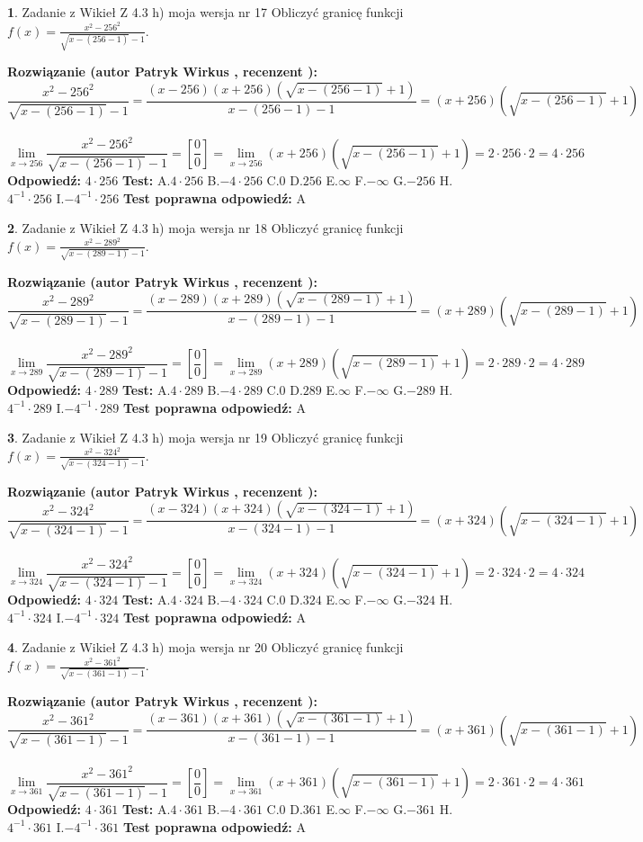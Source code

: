 \documentclass[12pt, a4paper]{article}
\theoremstyle{definition} %
\newtheorem{zad}{}
\newcommand{\zadStart}[1]{\begin{zad}#1\newline}
\newcommand{\zadStop}{\end{zad}}
\newcommand{\rozwStart}[2]{\noindent \textbf{Rozwiązanie (autor #1 , recenzent #2): }\newline}
\newcommand{\rozwStop}{\newline}
\newcommand{\odpStart}{\noindent \textbf{Odpowiedź:}\newline}
\newcommand{\odpStop}{\newline}
\newcommand{\testStart}{\noindent \textbf{Test:}\newline}
\newcommand{\testStop}{\newline}
\newcommand{\kluczStart}{\noindent \textbf{Test poprawna odpowiedź:}\newline}
\newcommand{\kluczStop}{\newline}
\begin{document}
\zadStart{Zadanie z Wikieł Z 4.3 h) moja wersja nr 17}
Obliczyć granicę funkcji $f(x)=\frac{x^{2} - 256^{2}}{\sqrt{x-(256-1)}-1}$.
\zadStop
\rozwStart{Patryk Wirkus}{}
$$\frac{x^{2} - 256^{2}}{\sqrt{x-(256-1)}-1}=\frac{(x-256)(x+256)(\sqrt{x-(256-1)}+1)}{x-(256-1)-1}=(x+256)(\sqrt{x-(256-1)}+1)$$
\\
$$\lim\limits_{x\to 256}\frac{x^{2} - 256^{2}}{\sqrt{x-(256-1)}-1}=[\frac{0}{0}]=
\lim\limits_{x\to 256}(x+256)(\sqrt{x-(256-1)}+1) = 2\cdot256 \cdot 2 = 4 \cdot 256$$
\rozwStop
\odpStart
$4\cdot256$
\odpStop
\testStart
A.$4\cdot256$
B.$-4\cdot256$
C.$0$
D.$256$
E.$\infty$
F.$-\infty$
G.$-256$
H.$4^{-1}\cdot256$
I.$-4^{-1}\cdot256$
\testStop
\kluczStart
A
\kluczStop



\zadStart{Zadanie z Wikieł Z 4.3 h) moja wersja nr 18}
Obliczyć granicę funkcji $f(x)=\frac{x^{2} - 289^{2}}{\sqrt{x-(289-1)}-1}$.
\zadStop
\rozwStart{Patryk Wirkus}{}
$$\frac{x^{2} - 289^{2}}{\sqrt{x-(289-1)}-1}=\frac{(x-289)(x+289)(\sqrt{x-(289-1)}+1)}{x-(289-1)-1}=(x+289)(\sqrt{x-(289-1)}+1)$$
\\
$$\lim\limits_{x\to 289}\frac{x^{2} - 289^{2}}{\sqrt{x-(289-1)}-1}=[\frac{0}{0}]=
\lim\limits_{x\to 289}(x+289)(\sqrt{x-(289-1)}+1) = 2\cdot289 \cdot 2 = 4 \cdot 289$$
\rozwStop
\odpStart
$4\cdot289$
\odpStop
\testStart
A.$4\cdot289$
B.$-4\cdot289$
C.$0$
D.$289$
E.$\infty$
F.$-\infty$
G.$-289$
H.$4^{-1}\cdot289$
I.$-4^{-1}\cdot289$
\testStop
\kluczStart
A
\kluczStop



\zadStart{Zadanie z Wikieł Z 4.3 h) moja wersja nr 19}
Obliczyć granicę funkcji $f(x)=\frac{x^{2} - 324^{2}}{\sqrt{x-(324-1)}-1}$.
\zadStop
\rozwStart{Patryk Wirkus}{}
$$\frac{x^{2} - 324^{2}}{\sqrt{x-(324-1)}-1}=\frac{(x-324)(x+324)(\sqrt{x-(324-1)}+1)}{x-(324-1)-1}=(x+324)(\sqrt{x-(324-1)}+1)$$
\\
$$\lim\limits_{x\to 324}\frac{x^{2} - 324^{2}}{\sqrt{x-(324-1)}-1}=[\frac{0}{0}]=
\lim\limits_{x\to 324}(x+324)(\sqrt{x-(324-1)}+1) = 2\cdot324 \cdot 2 = 4 \cdot 324$$
\rozwStop
\odpStart
$4\cdot324$
\odpStop
\testStart
A.$4\cdot324$
B.$-4\cdot324$
C.$0$
D.$324$
E.$\infty$
F.$-\infty$
G.$-324$
H.$4^{-1}\cdot324$
I.$-4^{-1}\cdot324$
\testStop
\kluczStart
A
\kluczStop



\zadStart{Zadanie z Wikieł Z 4.3 h) moja wersja nr 20}
Obliczyć granicę funkcji $f(x)=\frac{x^{2} - 361^{2}}{\sqrt{x-(361-1)}-1}$.
\zadStop
\rozwStart{Patryk Wirkus}{}
$$\frac{x^{2} - 361^{2}}{\sqrt{x-(361-1)}-1}=\frac{(x-361)(x+361)(\sqrt{x-(361-1)}+1)}{x-(361-1)-1}=(x+361)(\sqrt{x-(361-1)}+1)$$
\\
$$\lim\limits_{x\to 361}\frac{x^{2} - 361^{2}}{\sqrt{x-(361-1)}-1}=[\frac{0}{0}]=
\lim\limits_{x\to 361}(x+361)(\sqrt{x-(361-1)}+1) = 2\cdot361 \cdot 2 = 4 \cdot 361$$
\rozwStop
\odpStart
$4\cdot361$
\odpStop
\testStart
A.$4\cdot361$
B.$-4\cdot361$
C.$0$
D.$361$
E.$\infty$
F.$-\infty$
G.$-361$
H.$4^{-1}\cdot361$
I.$-4^{-1}\cdot361$
\testStop
\kluczStart
A
\kluczStop
\end{document}
